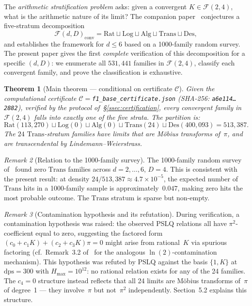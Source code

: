 \documentclass[12pt, reqno]{amsart}
\newtheorem{theorem}{Theorem}[section]
\theoremstyle{definition}
\theoremstyle{remark}
\newtheorem{remark}[theorem]{Remark}
\newcommand{\Rat}{\mathrm{Rat}}
\newcommand{\Log}{\mathrm{Log}}
\newcommand{\Alg}{\mathrm{Alg}}
\newcommand{\Trans}{\mathrm{Trans}}
\newcommand{\Des}{\mathrm{Des}}
\begin{document}
The \emph{arithmetic stratification problem} asks: given a convergent $K \in \mathcal{F}(2,4)$,
what is the arithmetic nature of its limit? The companion paper~\cite{logladder}
conjectures a five-stratum decomposition
\[
  \mathcal{F}(d,D)_{\mathrm{conv}} = \Rat \sqcup \Log \sqcup \Alg \sqcup \Trans \sqcup \Des,
\]
and establishes the framework for $d \le 6$ based on a 1000-family random survey.
The present paper gives the first \emph{complete} verification of this decomposition
for a specific $(d, D)$: we enumerate all $531{,}441$ families in $\mathcal{F}(2,4)$, classify
each convergent family, and prove the classification is exhaustive.

\begin{theorem}[Main theorem --- conditional on certificate $\mathcal{C}$]\label{thm:main}
Given the computational certificate
$\mathcal{C} = {}$\texttt{f1\_base\_certificate.json}
(SHA-256: \texttt{a6e114\ldots 2882}),
verified by the protocol of~\S\ref{ssec:certification},
every convergent family in $\mathcal{F}(2,4)$ falls into exactly one of
the five strata. The partition is:
\[
  \Rat(113{,}270) \sqcup \Log(0) \sqcup \Alg(0) \sqcup \Trans(24) \sqcup \Des(400{,}093) = 513{,}387.
\]
The $24$ $\Trans$-stratum families have limits that are M\"obius transforms of~$\pi$,
and are transcendental by Lindemann--Weierstrass.
\end{theorem}

\begin{remark}[Relation to the 1000-family survey]\label{rem:survey}
The 1000-family random
survey of~\cite{logladder} found zero $\Trans$ families across $d=2,\dots,6$, $D=4$.
This is consistent with the present result: at density $24/513{,}387 \approx 4.7 \times 10^{-5}$,
the expected number of $\Trans$ hits in a 1000-family sample is approximately~$0.047$,
making zero hits the most probable outcome. The $\Trans$ stratum is sparse but
non-empty.
\end{remark}

\begin{remark}[Contamination hypothesis and its refutation]\label{rem:contam}
During verification,
a contamination hypothesis was raised: the observed PSLQ relations all have
$\pi^2$-coefficient equal to zero, suggesting the factored form
$(c_0 + c_1 K) + (c_2 + c_3 K)\pi = 0$ might arise from rational~$K$ via
spurious factoring (cf.\ Remark~3.2 of~\cite{logladder} for the analogous
$\ln(2)$-contamination mechanism). This hypothesis was refuted by PSLQ against
the basis $\{1, K\}$ at $\mathrm{dps}=300$ with $H_{\max}=10^{12}$: no rational relation exists
for any of the 24 families. The $c_4=0$ structure instead reflects that all
24 limits are M\"obius transforms of~$\pi$ of degree~1 --- they involve~$\pi$ but
not~$\pi^2$ independently. Section~5.2 explains this structure.
\end{remark}
\end{document}
